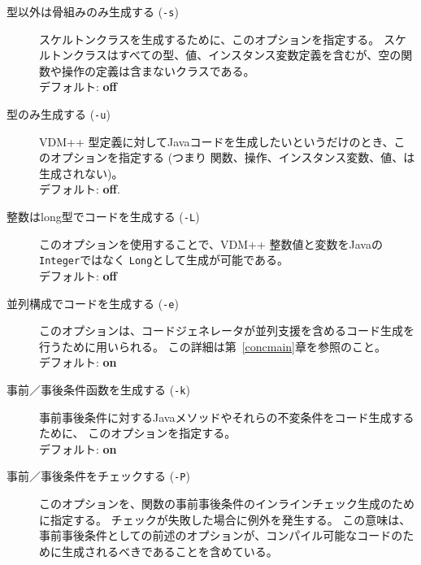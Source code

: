 \documentclass[\pformat,11pt]{jarticle}
\begin{document}
\begin{description}
\item [型以外は骨組みのみ生成する ({\tt -s})] 
  スケルトンクラスを生成するために、このオプションを指定する。
スケルトンクラスはすべての型、値、インスタンス変数定義を含むが、空の関数や操作の定義は含まないクラスである。 \\
デフォルト: \textbf{off}
\item [型のみ生成する ({\tt -u})] 
  VDM++ 型定義に対してJavaコードを生成したいというだけのとき、このオプションを指定する (つまり 関数、操作、インスタンス変数、値、は生成されない)。 \\
デフォルト: \textbf{off}.%
\item [整数はlong型でコードを生成する ({\tt -L})]
  このオプションを使用することで、VDM++ 整数値と変数をJavaの\texttt{Integer}ではなく \texttt{Long}として生成が可能である。 \\
デフォルト: \textbf{off}
\item [並列構成でコードを生成する ({\tt -e})]
  このオプションは、コードジェネレータが並列支援を含めるコード生成を行うために用いられる。
この詳細は第~\ref{concmain}章を参照のこと。 \\
デフォルト: \textbf{on}
\item [事前／事後条件函数を生成する ({\tt -k})] 
事前事後条件に対するJavaメソッドやそれらの不変条件をコード生成するために、 このオプションを指定する。 \\
デフォルト: \textbf{on}
\item [事前／事後条件をチェックする ({\tt -P})] 
 このオプションを、関数の事前事後条件のインラインチェック生成のために指定する。
チェックが失敗した場合に例外を発生する。
この意味は、事前事後条件としての前述のオプションが、コンパイル可能なコードのために生成されるべきであることを含めている。 \\

\end{description}
\end{document}
